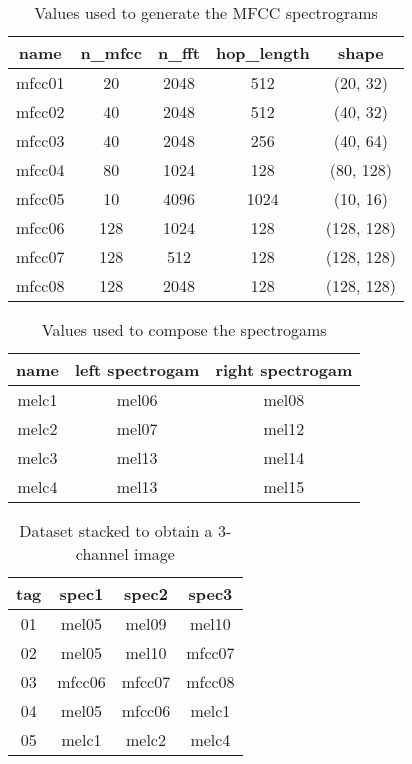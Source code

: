 \begin{table}[H]
    \centering
    \caption{Values used to generate the MFCC spectrograms}
    \label{tab:mfcc_values}
    \begin{tabular}{|c|cccc|}
        \hline
        name & n\_mfcc & n\_fft & hop\_length & shape \\
        \hline
        mfcc01 & 20  & 2048 & 512  & (20, 32) \\
        mfcc02 & 40  & 2048 & 512  & (40, 32) \\
        mfcc03 & 40  & 2048 & 256  & (40, 64) \\
        mfcc04 & 80  & 1024 & 128  & (80, 128) \\
        mfcc05 & 10  & 4096 & 1024 & (10, 16) \\
        mfcc06 & 128 & 1024 & 128  & (128, 128) \\
        mfcc07 & 128 & 512  & 128  & (128, 128) \\
        mfcc08 & 128 & 2048 & 128  & (128, 128) \\
        \hline
    \end{tabular}
\end{table}

\begin{table}[H]
    \centering
    \caption{Values used to compose the spectrogams}
    \label{tab:compose_values}
    \begin{tabular}{|c|cc|}
        \hline
        name & left spectrogam & right spectrogam \\
        \hline
        melc1 & mel06 & mel08 \\
        melc2 & mel07 & mel12 \\
        melc3 & mel13 & mel14 \\
        melc4 & mel13 & mel15 \\
        \hline
    \end{tabular}
\end{table}

\begin{table}[H]
    \centering
    \caption{Dataset stacked to obtain a 3-channel image}
    \label{tab:ch3_values}
    \begin{tabular}{|c|ccc|}
        \hline
        tag & spec1 & spec2 & spec3 \\
        \hline
        01 & mel05  & mel09  & mel10 \\
        02 & mel05  & mel10  & mfcc07 \\
        03 & mfcc06 & mfcc07 & mfcc08 \\
        04 & mel05  & mfcc06 & melc1 \\
        05 & melc1  & melc2  & melc4 \\
        \hline
    \end{tabular}
\end{table}

